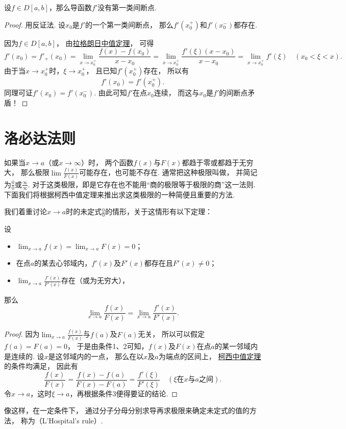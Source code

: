 \begin{theorem}
设\(f \in D[a,b]\)，那么导函数\(f'\)没有第一类间断点.
\begin{proof}
用反证法.
设\(x_0\)是\(f'\)的一个第一类间断点，
那么\(f'(x_0^+)\)和\(f'(x_0^-)\)都存在.

因为\(f \in D[a,b]\)，
由\hyperref[theorem:微分中值定理.拉格朗日中值定理]{拉格朗日中值定理}，
可得\[
	f'(x_0)
	= f'_+(x_0)
	= \lim_{x \to x_0^+} \frac{f(x)-f(x_0)}{x-x_0}
	= \lim_{x \to x_0^+} \frac{f'(\xi) (x-x_0)}{x-x_0}
	= \lim_{x \to x_0^+} f'(\xi)
	\quad(x_0<\xi<x).
\]
由于当\(x \to x_0^+\)时，\(\xi \to x_0^+\)，
且已知\(f'(x_0^+)\)存在，
所以有\[
	f'(x_0)=f'(x_0^+).
\]
同理可证\(f'(x_0)=f'(x_0^-)\).
由此可知\(f'\)在点\(x_0\)连续，
而这与\(x_0\)是\(f'\)的间断点矛盾！
\end{proof}
\end{theorem}

\section{洛必达法则}
如果当\(x \to a\)（或\(x \to \infty\)）时，
两个函数\(f(x)\)与\(F(x)\)都趋于零或都趋于无穷大，
那么极限\(\lim\frac{f(x)}{F(x)}\)可能存在，也可能不存在.
通常把这种极限叫做，
并简记为\(\frac{0}{0}\)或\(\frac{\infty}{\infty}\).
对于这类极限，即是它存在也不能用“商的极限等于极限的商”这一法则.
下面我们将根据柯西中值定理来推出求这类极限的一种简便且重要的方法.

我们着重讨论\(x \to a\)时的未定式\(\frac{0}{0}\)的情形，关于这情形有以下定理：
\begin{theorem}\label{theorem:微分中值定理.洛必达法则1}
设\begin{itemize}
	\item \(\lim_{x\to a} f(x) = \lim_{x\to a} F(x) = 0\)；
	\item 在点\(a\)的某去心邻域内，\(f'(x)\)及\(F'(x)\)都存在且\(F'(x) \neq 0\)；
	\item \(\lim_{x \to a} \frac{f'(x)}{F'(x)}\)存在（或为无穷大），
\end{itemize}
那么\[
	\lim_{x \to a} \frac{f(x)}{F(x)}
	= \lim_{x \to a} \frac{f'(x)}{F'(x)}.
\]
\begin{proof}
因为\(\lim_{x\to a} \frac{f(x)}{F(x)}\)与\(f(a)\)及\(F(a)\)无关，
所以可以假定\(f(a)=F(a)=0\)，
于是由条件1、2可知，\(f(x)\)及\(F(x)\)在点\(a\)的某一邻域内是连续的.
设\(x\)是这邻域内的一点，
那么在以\(x\)及\(a\)为端点的区间上，
\hyperref[theorem:微分中值定理.柯西中值定理]{柯西中值定理}的条件均满足，
因此有\[
	\frac{f(x)}{F(x)}
	= \frac{f(x)-f(a)}{F(x)-F(a)}
	= \frac{f'(\xi)}{F'(\xi)}
	\quad(\text{\(\xi\)在\(x\)与\(a\)之间}).
\]
令\(x \to a\)，这时\(\xi \to a\)，再根据条件3便得要证的结论.
\end{proof}
\end{theorem}
像这样，在一定条件下，
通过分子分母分别求导再求极限来确定未定式的值的方法，
称为（L'Hospital's rule）.

